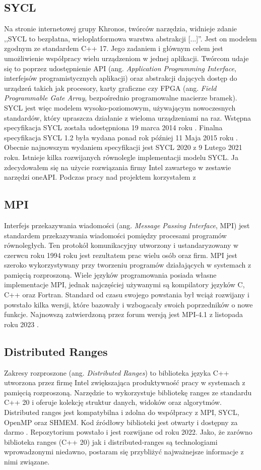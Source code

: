 \documentclass[a4paper,12pt]{book} %
\begin{document}
\subsection{SYCL}
Na stronie internetowej grupy Khronos, twórców narzędzia, widnieje zdanie ,,SYCL to bezpłatna, wieloplatformowa warstwa abstrakcji [...]''\cite{SYCL-overview}. Jest on modelem zgodnym ze standardem C++ 17. Jego zadaniem i głównym celem jest umożliwienie współpracy wielu urządzeniom w jednej aplikacji. Twórcom udaje się to poprzez udostępnienie API (ang. \emph{Application Programming Interface}, interfejsów programistycznych aplikacji) oraz abstrakcji dających dostęp do urządzeń takich jak procesory, karty graficzne czy FPGA (ang. \emph{Field Programmable Gate Array}, bezpośrednio programowalne macierze bramek). SYCL jest więc modelem wysoko-poziomowym, używającym nowoczesnych standardów, który upraszcza działanie z wieloma urządzeniami na raz. Wstępna specyfikacja SYCL została udostępniona 19 marca 2014 roku \cite{SYCL1.2-provisional}. Finalna specyfikacja SYCL 1.2 była wydana ponad rok później 11 Maja 2015 roku \cite{SYCL1.2}. Obecnie najnowszym wydaniem specyfikacji jest SYCL 2020 z 9 Lutego 2021 roku. Istnieje kilka rozwijanych równolegle implementacji modelu SYCL. Ja zdecydowałem się na użycie rozwiązania firmy Intel zawartego w zestawie narzędzi oneAPI. Podczas pracy nad projektem korzystałem z
\subsection{MPI}
Interfejs przekazywania wiadomości (ang. \emph{Message Passing Interface}, MPI) jest standardem przekazywania wiadomości pomiędzy  procesami programów równoległych. Ten protokół komunikacyjny utworzony i ustandaryzowany w czerwcu roku 1994 roku jest rezultatem prac wielu osób oraz firm. MPI jest szeroko wykorzystywany przy tworzeniu programów działających w systemach z pamięcią rozproszoną. Wiele języków programowania posiada własne implementacje MPI, jednak najczęściej używanymi są kompilatory języków C, C++ oraz Fortran. Standard od czasu swojego powstania był wciąż rozwijany i powstało kilka wersji, które bazowały i wzbogacały swoich poprzedników o nowe funkcje. Najnowszą zatwierdzoną przez forum wersją jest MPI-4.1 z listopada roku 2023 \cite{mpi41}.
\subsection{Distributed Ranges}
Zakresy rozproszone (ang. \emph{Distributed Ranges}) to biblioteka języka C++ utworzona przez firmę Intel zwiększająca produktywność pracy w systemach z pamięcią rozproszoną. Narzędzie to wykorzystuje bibliotekę ranges ze standardu C++ 20 i oferuje kolekcję struktur danych, widoków oraz algorytmów. Distributed ranges jest kompatybilna i zdolna do współpracy z MPI, SYCL, OpenMP oraz SHMEM. Kod źródłowy biblioteki jest otwarty i dostępny za darmo \cite{dist-ranges}. Repozytorium powstało i jest rozwijane od roku 2022. Jako, że zarówno biblioteka ranges (C++ 20) jak i distributed-ranges są technologiami wprowadzonymi niedawno, postaram się przybliżyć najważnejsze informacje z nimi związane.
\end{document}
